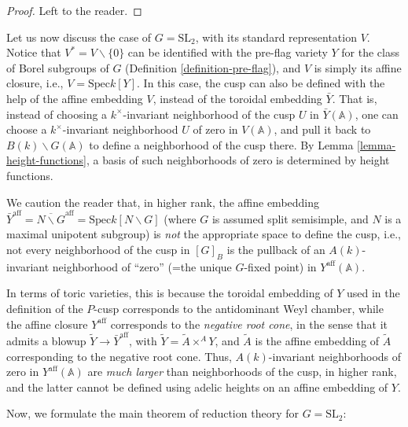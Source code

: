 \begin{proof}
 Left to the reader.
\end{proof}


Let us now discuss the case of $G=\text{SL}_2$, with its standard representation $V$. Notice that $V^*=V\smallsetminus\{0\}$ can be identified with the pre-flag variety $Y$ for the class of Borel subgroups of $G$ (Definition \ref{definition-pre-flag}), and $V$ is simply its affine closure, i.e., $V= \text{Spec} k[Y]$. In this case, the cusp can also be defined with the help of the affine embedding $V$, instead of the toroidal embedding $\bar Y$. That is, instead of choosing a $k^\times$-invariant neighborhood of the cusp $U$ in $\bar Y(\mathbb A)$, one can choose a $k^\times$-invariant neighborhood $U$ of zero in $V(\mathbb A)$, and pull it back to $B(k)\backslash G(\mathbb A)$ to define a neighborhood of the cusp there. By Lemma \ref{lemma-height-functions}, a basis of such neighborhoods of zero is determined by height functions.


\begin{remark}
 \label{remark-basic-affine}
We caution the reader that, in higher rank, the affine embedding $\bar Y^{\text{aff}}=\overline{N\backslash G}^{\text{aff}} = \text{Spec} k[N\backslash G]$ (where $G$ is assumed split semisimple, and $N$ is a maximal unipotent subgroup) is \emph{not} the appropriate space to define the cusp, i.e., not every neighborhood of the cusp in $[G]_B$ is the pullback of an $A(k)$-invariant neighborhood of ``zero'' (=the unique $G$-fixed point) in $Y^{\text{aff}}(\mathbb A)$. 

In terms of toric varieties, this is because the toroidal embedding of $Y$ used in the definition of the $P$-cusp corresponds to the antidominant Weyl chamber, while the affine closure $Y^{\text{aff}}$ corresponds to the \emph{negative root cone}, in the sense that it admits a blowup $\tilde Y \to \bar Y^{\text{aff}}$, with $\tilde Y = \tilde A\times^A Y$, and $\tilde A$ is the affine embedding of $\tilde A$ corresponding to the negative root cone. Thus, $A(k)$-invariant neighborhoods of zero in $Y^{\text{aff}}(\mathbb A)$ are \emph{much larger} than neighborhoods of the cusp, in higher rank, and the latter cannot be defined using adelic heights on an affine embedding of $Y$.
\end{remark}

Now, we formulate the main theorem of reduction theory for $G=\text{SL}_2$:

